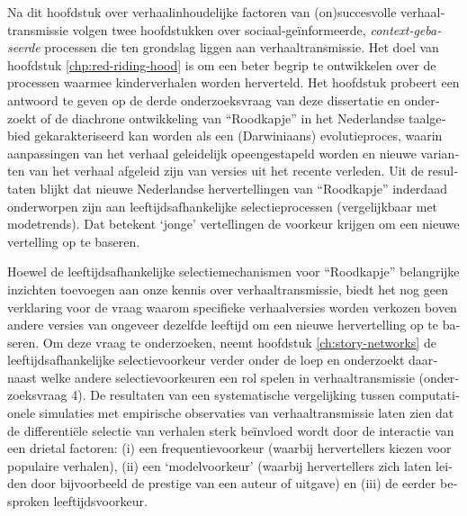 \begin{otherlanguage}{dutch}
Na dit hoofdstuk over verhaalinhoudelijke factoren van (on)\-succesvolle verhaaltransmissie volgen twee hoofdstukken over sociaal-geïnformeerde, \emph{context-gebaseerde} processen die ten grondslag liggen aan verhaaltransmissie. Het doel van hoofdstuk \ref{chp:red-riding-hood} is om een beter begrip te ontwikkelen over de processen waarmee kinderverhalen worden herverteld. Het hoofdstuk probeert een antwoord te geven op de derde onderzoeksvraag van deze dissertatie en onderzoekt of de diachrone ontwikkeling van ``Roodkapje'' in het Nederlandse taalgebied gekarakteriseerd kan worden als een (Darwiniaans) evolutieproces, waarin aanpassingen van het verhaal geleidelijk opeengestapeld worden en nieuwe varianten van het verhaal afgeleid zijn van versies uit het recente verleden. Uit de resultaten blijkt dat nieuwe Nederlandse hervertellingen van ``Roodkapje'' inderdaad onderworpen zijn aan leeftijdsafhankelijke selectieprocessen (vergelijkbaar met modetrends). Dat betekent `jonge' vertellingen de voorkeur krijgen om een nieuwe vertelling op te baseren.

Hoewel de leeftijdsafhankelijke selectiemechanismen voor ``Roodkapje'' belangrijke inzichten toevoegen aan onze kennis over verhaaltransmissie, biedt het nog geen verklaring voor de vraag waarom specifieke verhaalversies worden verkozen boven andere versies van ongeveer dezelfde leeftijd om een nieuwe hervertelling op te baseren. Om deze vraag te onderzoeken, neemt hoofdstuk \ref{ch:story-networks} de leeftijdsafhankelijke selectievoorkeur verder onder de loep en onderzoekt daarnaast welke andere selectievoorkeuren een rol spelen in verhaaltransmissie (onderzoeksvraag 4). De resultaten van een systematische vergelijking tussen computationele simulaties met empirische observaties van verhaaltransmissie laten zien dat de differentiële selectie van verhalen sterk beïnvloed wordt door de interactie van een drietal factoren: (i) een frequentievoorkeur (waarbij hervertellers kiezen voor populaire verhalen), (ii) een `modelvoorkeur' (waarbij hervertellers zich laten leiden door bijvoorbeeld de prestige van een auteur of uitgave) en (iii) de eerder besproken leeftijdsvoorkeur. 

\end{otherlanguage}